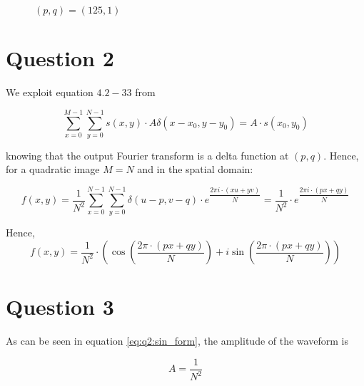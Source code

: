 \documentclass[12pt]{article}
\begin{document}
	  	\begin{figure}[!htb]
			\centering
			\scalebox{0.7}{}
			\caption{$(p,q)=(125,1)$}
			\label{fig:1251}
	  	\end{figure}
	  	
	  	
  	\section{Question 2}
  
  		We exploit equation $4.2-33$ from \cite{GZ}  
  
  		\begin{equation}
  			\sum_{x=0}^{M-1}\sum_{y=0}^{N-1} s(x,y) \cdot A \delta(x-x_0, y-y_0) = A \cdot s(x_0, y_0)
  		\end{equation}
  
  		knowing that the output Fourier transform is a delta function at $(p,q)$. Hence, for a quadratic image $M=N$ and in the spatial domain:
  
  		\begin{equation}
  			f(x,y)= \frac{1}{N^2} \sum_{x=0}^{N-1}\sum_{y=0}^{N-1} \delta(u - p, v - q) \cdot e^{\dfrac{2 \pi i \cdot (xu + yv)}{N}} = 
  			\frac{1}{N^2} \cdot e^{\dfrac{2 \pi i \cdot (px + qy)}{N}}
  		\end{equation}
  
	  	Hence, 
	  	\begin{equation}
	  		f(x,y) = \frac{1}{N^2} \cdot (\cos(\dfrac{2 \pi \cdot (px + qy)}{N}) + i\sin(\dfrac{2 \pi \cdot (px + qy)}{N}))
	  		\label{eq:q2:sin_form}
	  	\end{equation}
  
  
	  	\begin{figure}[!htb]
			\centering
			\scalebox{.5}{}
			\caption{}
			\label{fig:}
	  	\end{figure}

	  	\begin{figure}[!htb]
			\centering
			\scalebox{.5}{}
			\caption{}
			\label{fig:}
	  	\end{figure}

	\section{Question 3}

		As can be seen in equation \ref{eq:q2:sin_form}, the amplitude of the waveform is
	
		\begin{equation}
			A = \dfrac{1}{N^2}
		\end{equation}
	
\end{document}
